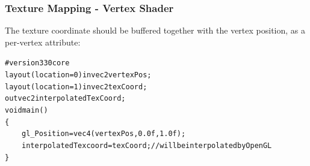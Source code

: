 \documentclass{beamer}
\begin{document}
\begin{frame}
\frametitle{Texture Mapping - Vertex Shader}
The texture coordinate should be buffered together with the vertex position,
as a per-vertex attribute:
\begin{alltt}\footnotesize
\#version 330 core\\

layout (location = 0) in vec2 vertexPos;\\
layout (location = 1) in vec2 texCoord;\\

out vec2 interpolatedTexCoord;\\

void main()\\
\{\\
\ensuremath{\qquad}gl\_Position = vec4(vertexPos, 0.0f, 1.0f);\\
\ensuremath{\qquad}interpolatedTexcoord = texCoord; // will be interpolated by OpenGL\\
\}
\end{alltt}
\end{frame}


%
%
%




\end{document}
